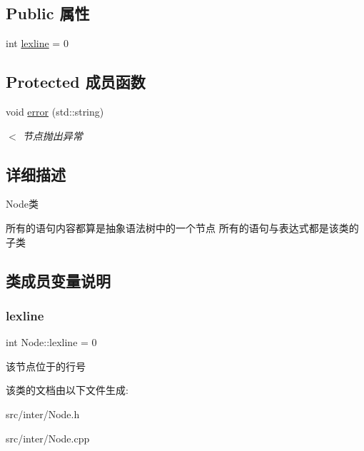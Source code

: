 \subsection*{Public 属性}
\begin{DoxyCompactItemize}
\item 
int \hyperlink{class_node_a8e50263ff9416be77e26edfbf6b926a1}{lexline} = 0
\end{DoxyCompactItemize}
\subsection*{Protected 成员函数}
\begin{DoxyCompactItemize}
\item 
\mbox{\label{class_node_aa1bb6c155277eb2c073a60c00674b8b6}} 
void \hyperlink{class_node_aa1bb6c155277eb2c073a60c00674b8b6}{error} (std\+::string)
\begin{DoxyCompactList}\small\item\em $<$ 节点抛出异常 \end{DoxyCompactList}\end{DoxyCompactItemize}


\subsection{详细描述}
Node类 

所有的语句内容都算是抽象语法树中的一个节点 所有的语句与表达式都是该类的子类 

\subsection{类成员变量说明}
\mbox{\label{class_node_a8e50263ff9416be77e26edfbf6b926a1}} 
\subsubsection{\texorpdfstring{lexline}{lexline}}
{\footnotesize\ttfamily int Node\+::lexline = 0}

该节点位于的行号 

该类的文档由以下文件生成\+:\begin{DoxyCompactItemize}
\item 
src/inter/Node.\+h\item 
src/inter/Node.\+cpp\end{DoxyCompactItemize}
